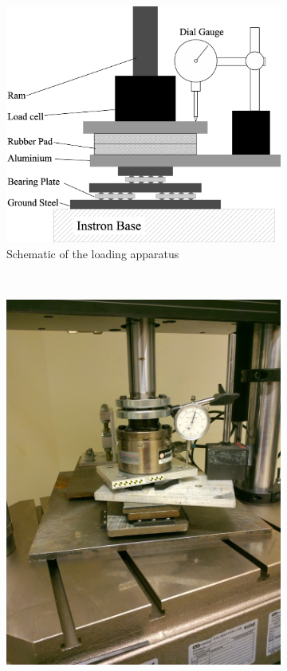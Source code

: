 \begin{figure}
\centering
\begin{subfigure}[b]{0.58\textwidth}
\includegraphics[width=\textwidth]{./appendixSupport/Figures/InstronCompliance}
\caption{Schematic of the loading apparatus}
\label{fig:instronCompSchematic}
\end{subfigure}
~
\begin{subfigure}[b]{0.38\textwidth}
\includegraphics[width=\textwidth]{./appendixSupport/Figures/InstronSetup}

\end{subfigure}
\end{figure}
